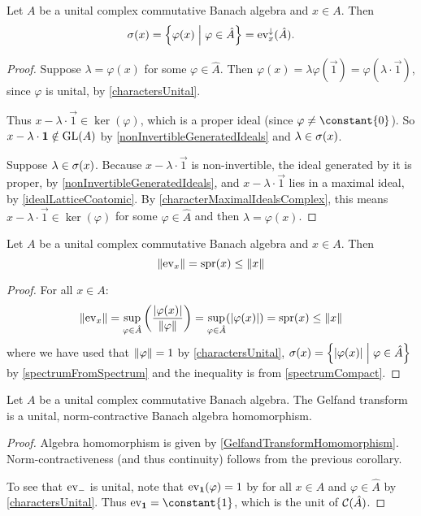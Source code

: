 \begin{proposition} \label{spectrumFromSpectrum}
Let $A$ be a unital complex commutative Banach algebra and $x\in A$. Then
\[ \spec(x) = \setbuilder{\varphi(x)}{\varphi\in\hat{A}} = \evalMap_x^{\imf}(\hat{A}). \]
\end{proposition}
\begin{proof}
Suppose $\lambda = \varphi(x)$ for some $\varphi\in\hat{A}$. Then $\varphi(x) = \lambda \varphi(\vec{1}) = \varphi(\lambda\cdot \vec{1})$, since $\varphi$ is unital, by \ref{charactersUnital}.

Thus $x-\lambda\cdot \vec{1}\in\ker(\varphi)$, which is a proper ideal (since $\varphi \neq \constant{0}$). So $x-\lambda\cdot \boldsymbol{\mathrm{1}}\notin\operatorname{GL}(A)$ by \ref{nonInvertibleGeneratedIdeals} and $\lambda \in\sigma(x)$.

Suppose $\lambda \in \sigma(x)$. Because $x-\lambda\cdot \vec{1}$ is non-invertible, the ideal generated by it is proper, by \ref{nonInvertibleGeneratedIdeals}, and $x-\lambda\cdot \vec{1}$ lies in a maximal ideal, by \ref{idealLatticeCoatomic}. By \ref{characterMaximalIdealsComplex}, this means $x-\lambda\cdot \vec{1} \in \ker(\varphi)$ for some $\varphi\in\hat{A}$ and then $\lambda = \varphi(x)$.
\end{proof}
\begin{corollary}
Let $A$ be a unital complex commutative Banach algebra and $x\in A$. Then
\[ \lVert\operatorname{ev}_{x}\rVert = \operatorname{spr}(x) \leq \lVert x\rVert \]
\end{corollary}
\begin{proof}
For all $x\in A$:
\[ \lVert\operatorname{ev}_x\rVert = \sup_{\varphi\in\hat{A}}\left( \frac{|\varphi(x)|}{\lVert\varphi\rVert} \right) = \sup_{\varphi\in\hat{A}}(|\varphi(x)|) = \operatorname{spr}(x) \leq \lVert x\rVert \]
where we have used that $\lVert\varphi\rVert = 1$ by \ref{charactersUnital}, $\spec(x) = \setbuilder{|\varphi(x)|}{\varphi\in\hat{A}}$ by \ref{spectrumFromSpectrum} and the inequality is from \ref{spectrumCompact}.
\end{proof}
\begin{corollary}
Let $A$ be a unital complex commutative Banach algebra. The Gelfand transform is a unital, norm-contractive Banach algebra homomorphism.
\end{corollary}
\begin{proof}
Algebra homomorphism is given by \ref{GelfandTransformHomomorphism}. Norm-contractiveness (and thus continuity) follows from the previous corollary.

To see that $\operatorname{ev}_{-}$ is unital, note that $\operatorname{ev}_{\boldsymbol{\mathrm{1}}}(\varphi) = 1$ by for all $x\in A$ and $\varphi\in \hat{A}$ by \ref{charactersUnital}. Thus $\evalMap_{\vec{1}} = \constant{1}$, which is the unit of $\operatorname{\mathcal{C}}(\hat{A})$.
\end{proof}

